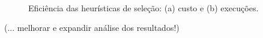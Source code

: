 \documentclass[10pt,conference,compsocconf]{IEEEtran}
\begin{document}

\begin{figure}[!t]
\centering
{}
\\
\caption{Eficiência das heurísticas de seleção: (a) custo e (b) execuções.}
\label{fig:cost-time}
\end{figure}

(... melhorar e expandir análise dos resultados!)
\end{document}
